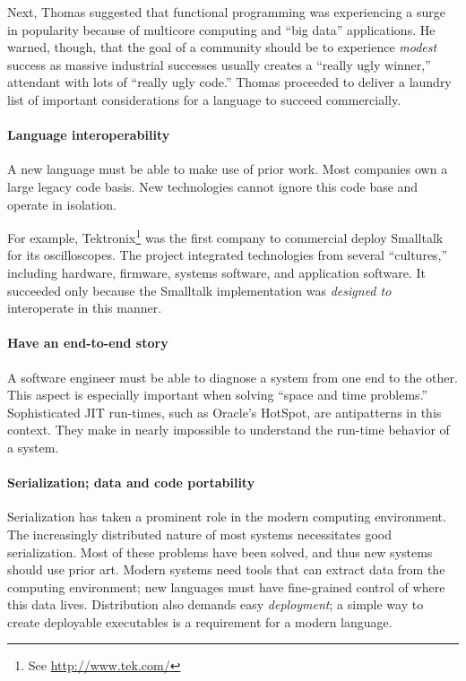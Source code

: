 \documentclass{jfp1}
\begin{document}
Next, Thomas suggested that functional programming was experiencing a surge
in popularity because of multicore computing and ``big data''
applications. He warned, though, that the goal of a community should be to
experience \textit{modest} success as massive industrial successes usually
creates a ``really ugly winner,'' attendant with lots of ``really ugly
code.'' Thomas proceeded to deliver a laundry list of important
considerations for a language to succeed commercially.

\paragraph{Language interoperability} A new language must be able to make
use of prior work. Most companies own a large legacy code basis. New
technologies cannot ignore this code base and operate in isolation.  

For example, Tektronix\footnote{See \url{http://www.tek.com/}} was the
first company to commercial deploy Smalltalk for its oscilloscopes. The
project integrated technologies from several ``cultures,'' including
hardware, firmware, systems software, and application software. It
succeeded only because the Smalltalk implementation was {\em designed to\/}
interoperate in this manner.

\paragraph{Have an end-to-end story} A software engineer must be able to
diagnose a system from one end to the other. This aspect is especially
important when solving ``space and time problems.'' Sophisticated JIT
run-times, such as Oracle's HotSpot, are antipatterns in this context. They
make in nearly impossible to understand the run-time behavior of a system.

\paragraph{Serialization; data and code portability} Serialization has
taken a prominent role in the modern computing environment. The
increasingly distributed nature of most systems necessitates good
serialization.  Most of these problems have been solved, and thus new
systems should use prior art. Modern systems need tools that can extract
data from the computing environment; new languages must have fine-grained
control of where this data lives. Distribution also demands easy
\textit{deployment}; a simple way to create deployable executables is a
requirement for a modern language.
\end{document}
